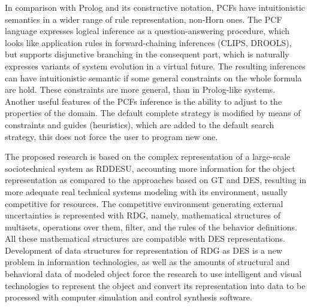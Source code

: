 \documentclass[conference]{IEEEtran}
\begin{document}
In comparison with Prolog and its constructive notation, PCFs have intuitionistic semantics in a wider range of rule representation, non-Horn ones. The PCF language expresses logical inference as a question-answering procedure, which looks like application rules in forward-chaining inferences (CLIPS, DROOLS), but supports disjunctive branching in the consequent part, which is naturally expresses variants of system evolution in a virtual future. The resulting inferences can have intuitionistic semantic if some general constraints on the whole formula are hold. These constraints are more general, than in Prolog-like systems. Another useful features of the PCFs inference is the ability to adjust to the properties of the domain. The default complete strategy is modified by means of constraints and guides (heuristics), which are added to the default search strategy, this does not force the user to program new one.



The proposed research is based on the complex representation of a large-scale sociotechnical system as RDDESU, accounting more information for the object representation as compared to the approaches based on GT and DES, resulting in more adequate real technical systems modeling with its environment, usually competitive for resources. The competitive environment generating external uncertainties is represented with RDG, namely, mathematical structures of multisets, operations over them, filter, and the rules of the behavior definitions.  All these mathematical structures are compatible with DES representations.  Development of data structures for representation of RDG as DES is a new problem in information technologies, as well as the amounts of structural and behavioral data of modeled object force the research to use intelligent and visual technologies to represent the object and convert its representation into data to be processed with computer simulation and control synthesis software.


\end{document}

